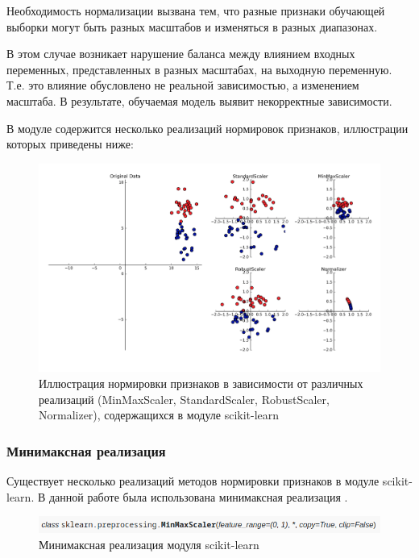 Необходимость нормализации вызвана тем, что разные признаки обучающей выборки
могут быть разных масштабов и изменяться в разных диапазонах.

В этом случае возникает нарушение баланса между влиянием входных переменных,
представленных в разных масштабах, на выходную переменную. Т.е. это влияние обусловлено
не реальной зависимостью, а изменением масштаба. В результате, обучаемая модель
выявит некорректные зависимости.

В модуле содержится несколько реализаций нормировок признаков, иллюстрации которых приведены ниже:

\begin{figure}[H]
    \centering
    \includegraphics[width=\linewidth]{images/scaling.png}
    \caption{Иллюстрация нормировки признаков в зависимости от различных реализаций
    (MinMaxScaler, StandardScaler, RobustScaler, Normalizer),
    содержащихся в модуле scikit-learn \cite{scikit-learn}}
    \label{fig_scaling}
\end{figure}

\subsubsection{Минимаксная реализация}

Существует несколько реализаций методов нормировки признаков в модуле scikit-learn.
В данной работе была использована минимаксная реализация \cite{scikit-learn}.

\begin{figure}[H]
    \centering
    \includegraphics[width=\linewidth]{images/9.png}
    \caption{Минимаксная реализация модуля scikit-learn}
    \label{fig_9}
\end{figure}

